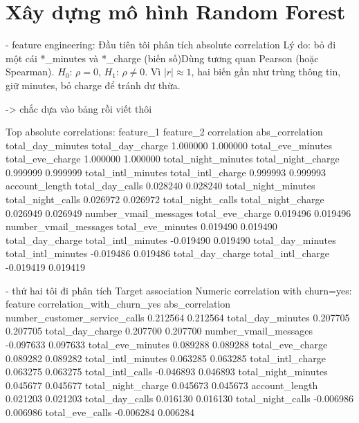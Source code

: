 
\section{Xây dựng mô hình Random Forest}
- feature engineering: 
Đầu tiên tôi phân tích absolute correlation
Lý do: bỏ đi một cái 
*_minutes và *_charge (biến số)Dùng tương quan Pearson (hoặc Spearman).
\(H_0\): \(\rho = 0\), \(H_1\): \(\rho \neq 0\).
Vì \(|r| \approx 1\), hai biến gần như trùng thông tin, giữ minutes, bỏ charge để tránh dư thừa.

-> chắc dựa vào bảng rồi viết thôi

Top absolute correlations:
            feature_1          feature_2  correlation  abs_correlation
    total_day_minutes   total_day_charge     1.000000         1.000000
    total_eve_minutes   total_eve_charge     1.000000         1.000000
  total_night_minutes total_night_charge     0.999999         0.999999
   total_intl_minutes  total_intl_charge     0.999993         0.999993
       account_length    total_day_calls     0.028240         0.028240
  total_night_minutes  total_night_calls     0.026972         0.026972
    total_night_calls total_night_charge     0.026949         0.026949
number_vmail_messages   total_eve_charge     0.019496         0.019496
number_vmail_messages  total_eve_minutes     0.019490         0.019490
     total_day_charge total_intl_minutes    -0.019490         0.019490
    total_day_minutes total_intl_minutes    -0.019486         0.019486
     total_day_charge  total_intl_charge    -0.019419         0.019419

- thứ hai tôi đi phân tích Target association
Numeric correlation with churn=yes:
                      feature  correlation_with_churn_yes  abs_correlation
number_customer_service_calls                    0.212564         0.212564
            total_day_minutes                    0.207705         0.207705
             total_day_charge                    0.207700         0.207700
        number_vmail_messages                   -0.097633         0.097633
            total_eve_minutes                    0.089288         0.089288
             total_eve_charge                    0.089282         0.089282
           total_intl_minutes                    0.063285         0.063285
            total_intl_charge                    0.063275         0.063275
             total_intl_calls                   -0.046893         0.046893
          total_night_minutes                    0.045677         0.045677
           total_night_charge                    0.045673         0.045673
               account_length                    0.021203         0.021203
              total_day_calls                    0.016130         0.016130
            total_night_calls                   -0.006986         0.006986
              total_eve_calls                   -0.006284         0.006284

